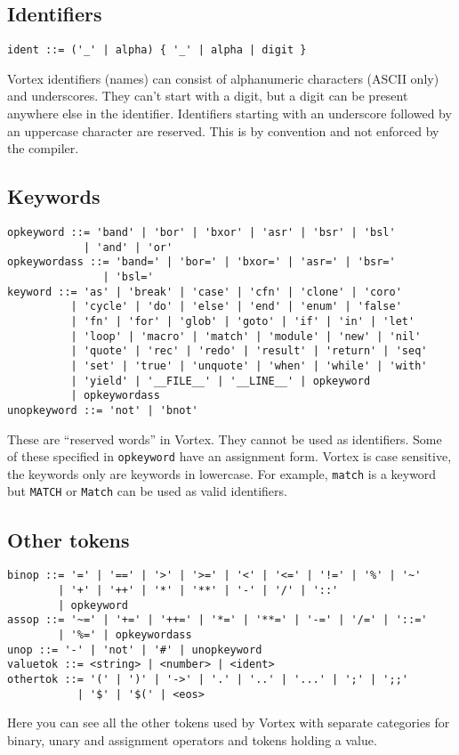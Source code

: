 \documentclass{article}
\begin{document}
\subsection{Identifiers}
\begin{lstlisting}[language=bnf]
ident ::= ('_' | alpha) { '_' | alpha | digit }
\end{lstlisting}
Vortex identifiers (names) can consist of alphanumeric characters (ASCII only)
and underscores. They can't start with a digit, but a digit can be present
anywhere else in the identifier. Identifiers starting with an underscore
followed by an uppercase character are reserved. This is by convention and
not enforced by the compiler.
\subsection{Keywords}
\begin{lstlisting}[language=bnf]
opkeyword ::= 'band' | 'bor' | 'bxor' | 'asr' | 'bsr' | 'bsl'
            | 'and' | 'or'
opkeywordass ::= 'band=' | 'bor=' | 'bxor=' | 'asr=' | 'bsr='
               | 'bsl='
keyword ::= 'as' | 'break' | 'case' | 'cfn' | 'clone' | 'coro'
          | 'cycle' | 'do' | 'else' | 'end' | 'enum' | 'false'
          | 'fn' | 'for' | 'glob' | 'goto' | 'if' | 'in' | 'let'
          | 'loop' | 'macro' | 'match' | 'module' | 'new' | 'nil'
          | 'quote' | 'rec' | 'redo' | 'result' | 'return' | 'seq'
          | 'set' | 'true' | 'unquote' | 'when' | 'while' | 'with'
          | 'yield' | '__FILE__' | '__LINE__' | opkeyword
          | opkeywordass
unopkeyword ::= 'not' | 'bnot'
\end{lstlisting}
These are \enquote{reserved words} in Vortex. They cannot be used as
identifiers. Some of these specified in \verb|opkeyword| have an assignment
form. Vortex is case sensitive, the keywords only are keywords in lowercase.
For example, \verb|match| is a keyword but \verb|MATCH| or \verb|Match| can
be used as valid identifiers.
\subsection{Other tokens}
\begin{lstlisting}[language=bnf]
binop ::= '=' | '==' | '>' | '>=' | '<' | '<=' | '!=' | '%' | '~'
        | '+' | '++' | '*' | '**' | '-' | '/' | '::'
        | opkeyword
assop ::= '~=' | '+=' | '++=' | '*=' | '**=' | '-=' | '/=' | '::='
        | '%=' | opkeywordass
unop ::= '-' | 'not' | '#' | unopkeyword
valuetok ::= <string> | <number> | <ident>
othertok ::= '(' | ')' | '->' | '.' | '..' | '...' | ';' | ';;'
           | '$' | '$(' | <eos>
\end{lstlisting}
Here you can see all the other tokens used by Vortex with separate categories
for binary, unary and assignment operators and tokens holding a value.
\end{document}
